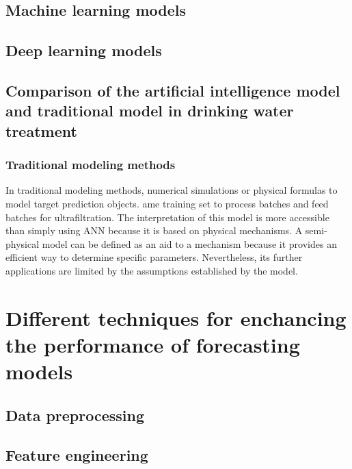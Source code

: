 \subsection{Machine learning models}

\subsection{Deep learning models}
\subsection{Comparison of the artificial intelligence model and traditional model in drinking water treatment}
\subsubsection{Traditional modeling methods}
In traditional modeling methods, numerical simulations or physical formulas to model target prediction objects. 
ame training set to process batches and feed batches for ultrafiltration. The interpretation of this model is 
more accessible than simply using ANN because it is based on physical mechanisms. A semi-physical model can 
be defined as an aid to a mechanism because it provides an efficient way to determine specific parameters. 
Nevertheless, its further applications are limited by the assumptions established by the model.
\section{Different techniques for enchancing the performance of forecasting models}
\subsection{Data preprocessing}

\subsection{Feature engineering}

